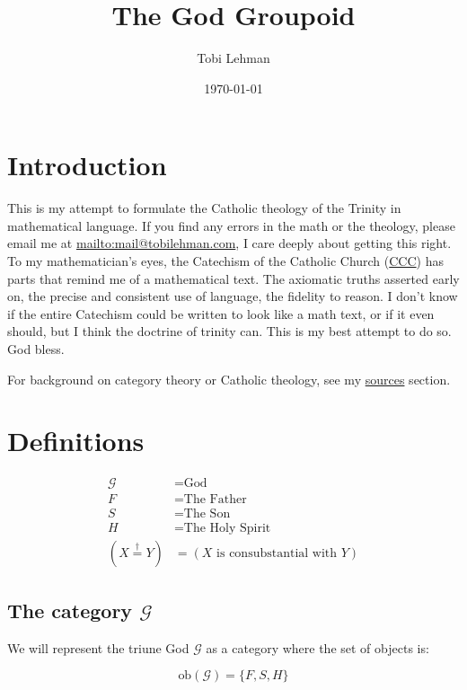 \documentclass[11pt]{article}
\author{Tobi Lehman}
\date{\today}
\title{The God Groupoid}
\begin{document}
\maketitle
\tableofcontents

\section{Introduction}
\label{sec:orgdf5438b}
This is my attempt to formulate the Catholic theology of the Trinity in mathematical language. If you find any errors in the math or the theology, please email me at \url{mailto:mail@tobilehman.com}, I care deeply about getting this right. To my mathematician's eyes, the Catechism of the Catholic Church (\href{https://www.vatican.va/archive/ENG0015/\_INDEX.HTM}{CCC}) has parts that remind me of a mathematical text. The axiomatic truths asserted early on, the precise and consistent use of language, the fidelity to reason. I don't know if the entire Catechism could be written to look like a math text, or if it even should, but I think the doctrine of trinity can. This is my best attempt to do so. God bless.

For background on category theory or Catholic theology, see my \hyperref[sec:org717892e]{sources} section.
\section{Definitions}
\label{sec:orgdb00d48}
$$\begin{align}\mathcal{G} &= \text{God} \\ F &= \text{The Father}\\ S &= \text{The Son} \\ H &= \text{The Holy Spirit} \\ (X \stackrel{\dagger}{=} Y) &= (X \text{ is consubstantial with } Y) \end{align}$$
\subsection{The category \(\mathcal{G}\)}
\label{sec:orge39f9f8}

We will represent the triune God \(\mathcal{G}\) as a category where the set of objects is:

$$\text{ob}(\mathcal{G}) = \{F,S,H\}$$
\end{document}

